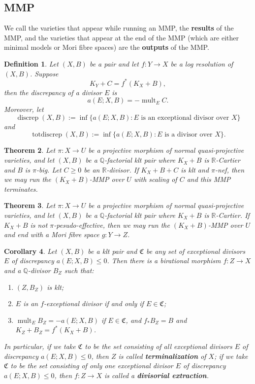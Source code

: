 \documentclass[11pt]{amsart}
\newtheorem{defn}{Definition}[section]
\newtheorem{thm}[defn]{Theorem}
\newtheorem{cor}[defn]{Corollary}
\begin{document}
\subsection{MMP}
We call the varieties that appear while running an MMP, the \textbf{results} of the MMP, and the varieties that appear at the end of the MMP (which are either minimal models or Mori fibre spaces) are the \textbf{outputs} of the MMP.
\begin{defn}
  Let $(X, B)$ be a pair and let  $f: Y\to X$ be a log resolution of $(X, B)$. Suppose
  \[
    K_{Y}+C=f^*(K_{X}+B)
    ,\]
  then the discrepancy  of a divisor $E$ is
  \[
    a(E;X,B)=-\operatorname{mult}_{E}C
    .\]
  Moreover, let
  \[
    \operatorname{discrep}(X, B) := \inf\{a(E; X, B) : E \text{ is an exceptional divisor over } X \}
  \]
  and
  \[
    \operatorname{totdiscrep}(X, B) :=\operatorname{inf}\{a(E; X, B) : E \text{ is a divisor over } X\}.
  \]
\end{defn}

\begin{thm}
  \cite[Corollary 1.4.2]{BCHM10} Let $ \pi: X\to U $ be a projective morphism of normal quasi-projective varieties, and let $(X, B)$ be a $\mathbb{Q}$-factorial klt pair where $K_{X}+B$ is $\mathbb{R}$-Cartier and $B$ is $\pi$-big. Let $C\geqslant0$ be an $\mathbb{R}$-divisor. If $K_{X}+B+C$ is klt and  $\pi$-nef, then we may run the $(K_{X}+B)$-MMP over $U$  with scaling of $C$ and this MMP terminates.
\end{thm}

\begin{thm}\label{notpseudoeffmfs}
  \cite[Corollary 1.3.3]{BCHM10} Let $ \pi: X\to U $ be a projective morphism of normal quasi-projective varieties, and let $(X, B)$ be a $\mathbb{Q}$-factorial klt pair where $K_{X}+B$ is $\mathbb{R}$-Cartier.  If $K_{X}+B$ is  not $\pi$-pesudo-effective, then we may run the $(K_{X}+B)$-MMP over  $U$  and end with a Mori fibre space $g:Y\to Z$.
\end{thm}

\begin{cor}\label{extraction}
  \cite[Corollary 13.7]{haconMinimalModelProgram2012} Let $ (X,B) $ be a  klt pair and $\mathfrak{C}$ be any set of exceptional divisors $E$  of discrepancy $ a(E;X,B)\leqslant 0 $. Then there is a birational morphism $ f:Z\to X $ and a $ \mathbb{Q} $-divisor $ B_Z $ such that:
  \begin{enumerate}
    \item $ (Z,B_Z) $ is klt;
    \item $ E $ is an $f$-exceptional divisor if and only if $ E\in \mathfrak{C} $;
    \item $ \operatorname{mult}_{E}B_Z=-a(E;X,B) $ if $E \in \mathfrak{C}$, and $ f_*B_Z=B $ and $ K_Z+B_Z=f^*(K_X+B) $.
  \end{enumerate}
  In particular, if we take $\mathfrak{C}$ to be the set consisting of all exceptional divisors $E$ of discrepancy $a(E; X, B)\leqslant 0$, then $ Z $ is called \textbf{terminalization} of $ X $; if we take $\mathfrak{C}$ to be the set consisting of only one exceptional divisor $E$ of discrepancy $a(E; X, B)\leqslant 0$, then $ f: Z\to X $ is called a \textbf{divisorial extraction}.
\end{cor}
\end{document}

